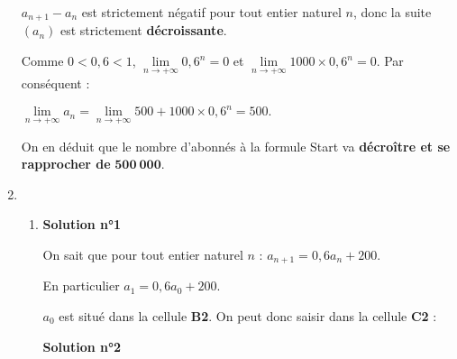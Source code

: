 \begin{corrige}
\begin{enumerate}
          \par
          $a_{n+1}-a_n$ est strictement négatif pour tout entier naturel $n$, donc la suite $(a_n)$ est strictement \textbf{décroissante}.
          \par
          \par
          Comme $0 < 0,6 < 1$, ${\lim\limits_{n \rightarrow +\infty}0,6^n=0}$ et ${\lim\limits_{n \rightarrow +\infty}1000 \times 0,6^n=0}$. Par conséquent :
          \par
          $\lim\limits_{n \rightarrow +\infty}a_n = \lim\limits_{n \rightarrow +\infty}500+1000 \times 0,6^n =500.$
          \par
          On en déduit que le nombre d'abonnés à la formule \og Start \fg{} va \textbf{décroître et se rapprocher de} $\bm{500~000}$.
          \item %
          \begin{enumerate}[label=\alph*.]
               \item %
               \textbf{Solution n°1}
               \par
               On sait que pour tout entier naturel $n$ : $a_{n+1}=0,6a_n+200$.
               \par
               En particulier $a_1=0,6a_0+200$.
               \par
               $a_0$ est situé dans la cellule \textbf{B2}. On peut donc saisir dans la cellule \textbf{C2} :
               \par
               \begin{center}
               \end{center}
               \par
               \textbf{Solution n°2}
               \par

\end{enumerate}
\end{enumerate}
\end{corrige}
